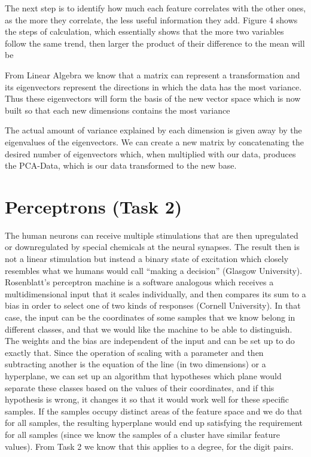 \documentclass{article}
\begin{document}
The next step is to identify how much each feature correlates with the other ones, as the more they correlate, the less useful information they add.
Figure 4 shows the steps of calculation, which essentially shows that the more two variables follow the same trend, then larger the product of their difference to the mean will be

From Linear Algebra we know that a matrix can represent a transformation and its eigenvectors represent the directions in which the data has the most variance.
Thus these eigenvectors will form the basis of the new vector space which is now built so that each new dimensions contains the most variance

The actual amount of variance explained by each dimension is given away by the eigenvalues of the eigenvectors.
We can create a new matrix by concatenating the desired number of eigenvectors which, when multiplied with our data, produces the PCA-Data, which is our data transformed to the new base. 

\section{Perceptrons (Task 2)}

The human neurons can receive multiple stimulations that are then upregulated or downregulated by special chemicals at the neural synapses.
The result then is not a linear stimulation but instead a binary state of excitation which closely resembles what we humans would call “making a decision” (Glasgow University).
Rosenblatt’s perceptron machine  is a software analogous which receives a multidimensional input that it scales individually, and then compares its sum to a bias in order to select one of two kinds of responses (Cornell University).
In that case, the input can be the coordinates of some samples that we know belong in different classes, and that we would like the machine to be able to distinguish.
The weights and the bias are independent of the input and can be set up to do exactly that.
Since the operation of scaling with a parameter and then subtracting another is the equation of the line (in two dimensions) or a hyperplane, we can set up an algorithm that hypotheses which plane would separate these classes based on the values of their coordinates, and if this hypothesis is wrong, it changes it so that it would work well for these specific samples.
If the samples occupy distinct areas of the feature space and we do that for all samples, the resulting hyperplane  would end up satisfying the requirement for all samples (since we know the samples of a cluster have similar feature values).
From Task 2 we know that this applies to a degree, for the digit pairs.
\end{document}
